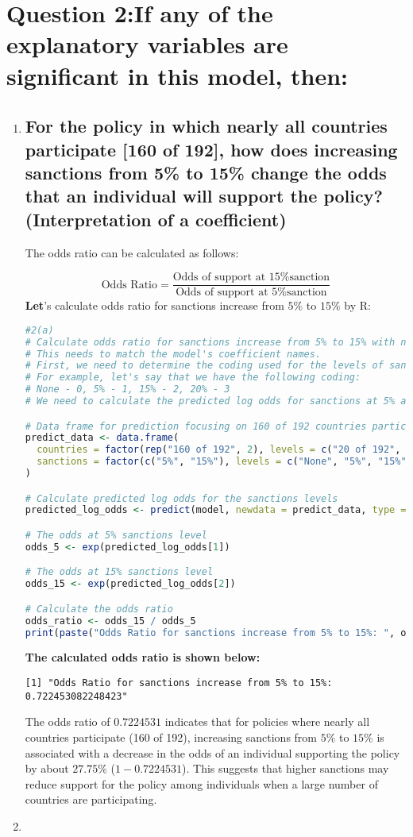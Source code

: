 \documentclass[12pt,letterpaper]{article}
\begin{document}
\section*{Question 2:If any of the explanatory variables are significant in this model, then:}
	\begin{enumerate}
		\item
		\subsection*{For the policy in which nearly all countries participate [160 of 192], how does increasing sanctions from 5\% to 15\% change the odds that an individual will support the policy? (Interpretation of a coefficient)}
  
  The odds ratio can be calculated as follows:

\textbf{\[
\text{Odds Ratio} = \frac{\text{Odds of support at 15\% sanction}}{\text{Odds of support at 5\% sanction}}
\]
  Let}'s calculate odds ratio for sanctions increase from $5\%$ to $15\%$ by R:
  \begin{lstlisting}[language=R]
#2(a)
# Calculate odds ratio for sanctions increase from 5% to 15% with nearly full participation
# This needs to match the model's coefficient names.
# First, we need to determine the coding used for the levels of sanctions
# For example, let's say that we have the following coding:
# None - 0, 5% - 1, 15% - 2, 20% - 3
# We need to calculate the predicted log odds for sanctions at 5% and 15%

# Data frame for prediction focusing on 160 of 192 countries participating
predict_data <- data.frame(
  countries = factor(rep("160 of 192", 2), levels = c("20 of 192", "80 of 192", "160 of 192")),
  sanctions = factor(c("5%", "15%"), levels = c("None", "5%", "15%", "20%"))
)

# Calculate predicted log odds for the sanctions levels
predicted_log_odds <- predict(model, newdata = predict_data, type = "link")

# The odds at 5% sanctions level
odds_5 <- exp(predicted_log_odds[1])

# The odds at 15% sanctions level
odds_15 <- exp(predicted_log_odds[2])

# Calculate the odds ratio
odds_ratio <- odds_15 / odds_5
print(paste("Odds Ratio for sanctions increase from 5% to 15%: ", odds_ratio))
  \end{lstlisting}
\textbf{The calculated odds ratio is shown below:}

\begin{verbatim}
[1] "Odds Ratio for sanctions increase from 5% to 15%:  0.722453082248423"
\end{verbatim}
The odds ratio of $0.7224531$ indicates that for policies where nearly all countries participate (160 of 192), increasing sanctions from $5\%$ to $15\%$ is associated with a decrease in the odds of an individual supporting the policy by about $27.75\%$ ($1 - 0.7224531$). This suggests that higher sanctions may reduce support for the policy among individuals when a large number of countries are participating.
		\item

\end{enumerate}
\end{document}
